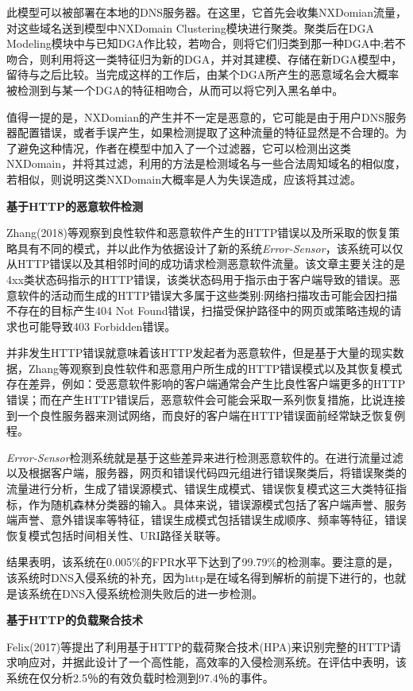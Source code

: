 \documentclass[12pt]{article} %
\begin{document}
此模型可以被部署在本地的DNS服务器。在这里，它首先会收集NXDomian流量，对这些域名送到模型中NXDomain Clustering模块进行聚类。聚类后在DGA Modeling模块中与已知DGA作比较，若吻合，则将它们归类到那一种DGA中;若不吻合，则利用将这一类特征归为新的DGA，并对其建模、存储在新DGA模型中，留待与之后比较。当完成这样的工作后，由某个DGA所产生的恶意域名会大概率被检测到与某一个DGA的特征相吻合，从而可以将它列入黑名单中。

值得一提的是，NXDomian的产生并不一定是恶意的，它可能是由于用户DNS服务器配置错误，或者手误产生，如果检测提取了这种流量的特征显然是不合理的。为了避免这种情况，作者在模型中加入了一个过滤器，它可以检测出这类NXDomain，并将其过滤，利用的方法是检测域名与一些合法周知域名的相似度，若相似，则说明这类NXDomain大概率是人为失误造成，应该将其过滤。

\textbf{基于HTTP的恶意软件检测}

Zhang(2018)\cite{Zhang}等观察到良性软件和恶意软件产生的HTTP错误以及所采取的恢复策略具有不同的模式，并以此作为依据设计了新的系统\emph{Error-Sensor}，该系统可以仅从HTTP错误以及其相邻时间的成功请求检测恶意软件流量。该文章主要关注的是4xx类状态码指示的HTTP错误，该类状态码用于指示由于客户端导致的错误。恶意软件的活动而生成的HTTP错误大多属于这些类别:网络扫描攻击可能会因扫描不存在的目标产生404 Not Found错误，扫描受保护路径中的网页或策略违规的请求也可能导致403 Forbidden错误。

并非发生HTTP错误就意味着该HTTP发起者为恶意软件，但是基于大量的现实数据，Zhang等观察到良性软件和恶意用户所生成的HTTP错误模式以及其恢复模式存在差异，例如：受恶意软件影响的客户端通常会产生比良性客户端更多的HTTP错误；而在产生HTTP错误后，恶意软件会可能会采取一系列恢复措施，比说连接到一个良性服务器来测试网络，而良好的客户端在HTTP错误面前经常缺乏恢复例程。

\emph{Error-Sensor}检测系统就是基于这些差异来进行检测恶意软件的。在进行流量过滤以及根据客户端，服务器，网页和错误代码四元组进行错误聚类后，将错误聚类的流量进行分析，生成了错误源模式、错误生成模式、错误恢复模式这三大类特征指标，作为随机森林分类器的输入。具体来说，错误源模式包括了客户端声誉、服务端声誉、意外错误率等特征，错误生成模式包括错误生成顺序、频率等特征，错误恢复模式包括时间相关性、URI路径关联等。

结果表明，该系统在0.005\%的FPR水平下达到了99.79\%的检测率。要注意的是，该系统时DNS入侵系统的补充，因为http是在域名得到解析的前提下进行的，也就是该系统在DNS入侵系统检测失败后的进一步检测。

\textbf{基于HTTP的负载聚合技术}

Felix(2017)\cite{Felix}等提出了利用基于HTTP的载荷聚合技术(HPA)来识别完整的HTTP请求响应对，并据此设计了一个高性能，高效率的入侵检测系统。在评估中表明，该系统在仅分析2.5％的有效负载时检测到97.4％的事件。
\end{document}
